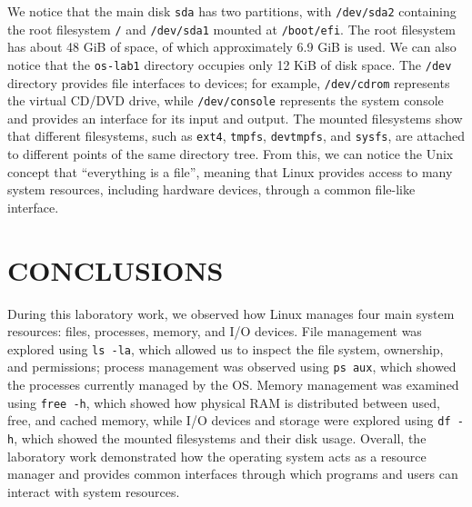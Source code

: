 \documentclass{tum_report}
\begin{document}
\par We notice that the main disk \texttt{sda} has two partitions, with \texttt{/dev/sda2} containing the root filesystem \texttt{/} and \texttt{/dev/sda1} mounted at \texttt{/boot/efi}. The root filesystem has about 48 GiB of space, of which approximately 6.9 GiB is used. We can also notice that the \texttt{os-lab1} directory occupies only 12 KiB of disk space. The \texttt{/dev} directory provides file interfaces to devices; for example, \texttt{/dev/cdrom} represents the virtual CD/DVD drive, while \texttt{/dev/console} represents the system console and provides an interface for its input and output. The mounted filesystems show that different filesystems, such as \texttt{ext4}, \texttt{tmpfs}, \texttt{devtmpfs}, and \texttt{sysfs}, are attached to different points of the same directory tree. From this, we can notice the Unix concept that ``everything is a file'', meaning that Linux provides access to many system resources, including hardware devices, through a common file-like interface.

\clearpage

\chapter{CONCLUSIONS}



\par During this laboratory work, we observed how Linux manages four main system resources: files, processes, memory, and I/O devices. File management was explored using \texttt{ls -la}, which allowed us to inspect the file system, ownership, and permissions; process management was observed using \texttt{ps aux}, which showed the processes currently managed by the OS. Memory management was examined using \texttt{free -h}, which showed how physical RAM is distributed between used, free, and cached memory, while I/O devices and storage were explored using \texttt{df -h}, which showed the mounted filesystems and their disk usage. Overall, the laboratory work demonstrated how the operating system acts as a resource manager and provides common interfaces through which programs and users can interact with system resources.

\clearpage


%

\clearpage
\end{document}
